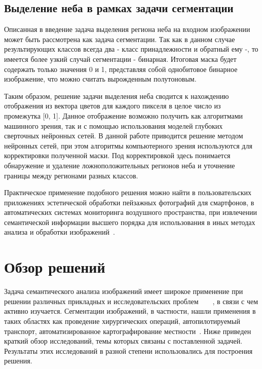 \subsection{Выделение неба в рамках задачи сегментации}

Описанная в введение задача выделения региона неба на входном изображении может быть рассмотрена как задача сегментации. Так как в данном случае результирующих классов всегда два - класс принадлежности и обратный ему -, то имеется более узкий случай сегментации - бинарная. Итоговая маска будет содержать только значения 0 и 1, представляя собой однобитовое бинарное изображение, что можно считать вырожденным полутоновым.

Таким образом, решение задачи выделения неба сводится к нахождению отображения из вектора цветов для каждого пикселя в целое число из промежутка [0, 1]. Данное отображение возможно получить как алгоритмами машинного зрения, так и с помощью использования моделей глубоких сверточных нейронных сетей. В данной работе приводится решение методом нейронных сетей, при этом алгоритмы компьютерного зрения используются для корректировки полученной маски. Под корректировкой здесь понимается обнаружение и удаление ложноположительных регионов неба и уточнение границы между регионами разных классов.

Практическое применение подобного решения можно найти в пользовательских приложениях эстетической обработки пейзажных фотографий для смартфонов, в автоматических системах мониторинга воздушного пространства, при извлечении семантической информации высшего порядка для использования в иных методах анализа и обработки изображений~\autocite{7415405}.

\section{Обзор решений}

Задача семантического анализа изображений имеет широкое применение при решении различных прикладных и исследовательских проблем~\autocite{maier2018gentle}~\autocite{pan2019image}~\autocite{stabinger2020evaluating}~\autocite{li2015brief}, в связи с чем активно изучается. Сегментации изображений, в частности, нашли применения в таких областях как проведение хирургических операций, автопилотируемый транспорт, автоматизированное картографирование местности~\autocite{liu2018recent}. Ниже приведен краткий обзор исследований, темы которых связаны с поставленной задачей. Результаты этих исследований в разной степени использовались для построения решения. 

